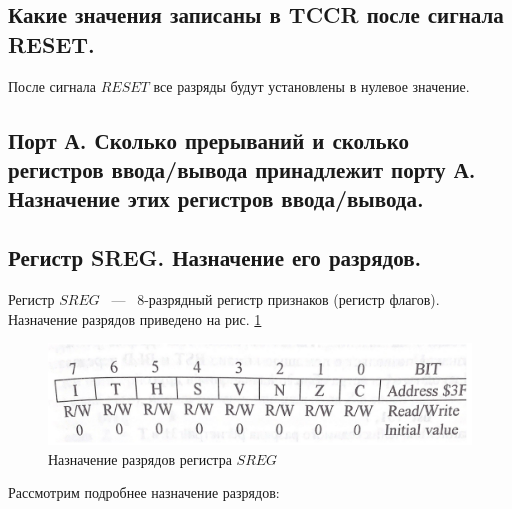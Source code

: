 \subsection{Какие значения записаны в TCCR после сигнала RESET.}
После сигнала $RESET$ все разряды будут установлены в нулевое значение.

\subsection{Порт А. Сколько прерываний и сколько регистров ввода/вывода принадлежит порту А. Назначение этих регистров ввода/вывода.}


\subsection{Регистр SREG. Назначение его  разрядов.}
Регистр $SREG$ ~---~ $8$-разрядный регистр признаков (регистр флагов).
Назначение разрядов приведено на рис. \ref{img::2_3_2}
\begin{figure}[h]
  \includegraphics[width=\linewidth]{./src/pics/2.3.2.png}
  \caption{Назначение разрядов регистра $SREG$}
  \label{img::2_3_2}
\end{figure}
Рассмотрим подробнее назначение разрядов:
